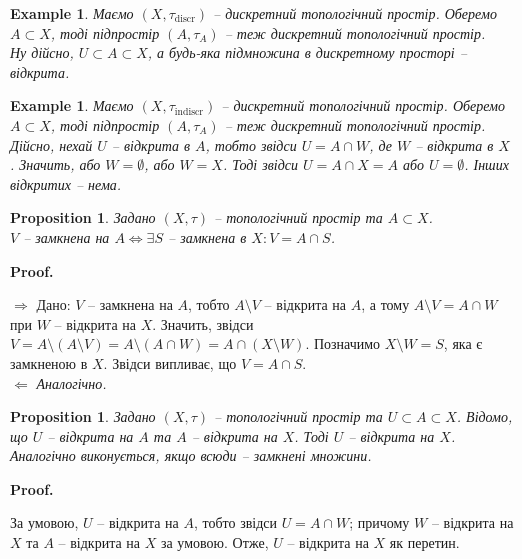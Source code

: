 \documentclass[a4paper, 10pt]{article}
\makeatletter
\def\rightproof{$\boxed{\Rightarrow}$ }
\def\leftproof{$\boxed{\Leftarrow}$ }
\theoremstyle{theoremdd}
\newtheorem{example}[theorem]{Example}
\newtheorem{proposition}[theorem]{Proposition}
\renewenvironment{proof}[1][Proof.\\]{\par
\pushQED{\hfill \qed}%
\normalfont \topsep6\p@\@plus6\p@\relax
\trivlist
\item\relax
{\bfseries
#1\@addpunct{.}}\hspace\labelsep\ignorespaces
}{%
\popQED\endtrivlist\@endpefalse
}
\makeatother
\begin{document}
\begin{example}
Маємо $(X,\tau_{\text{discr}})$ -- дискретний топологічний простір. Оберемо $A \subset X$, тоді підпростір $(A,\tau_{A})$ -- теж дискретний топологічний простір.\\
Ну дійсно, $U \subset A \subset X$, а будь-яка підмножина в дискретному просторі -- відкрита.
\end{example}

\begin{example}
\label{subspace_of_indiscrete_space_is_also_indiscrete}
Маємо $(X,\tau_{\text{indiscr}})$ -- дискретний топологічний простір. Оберемо $A \subset X$, тоді підпростір $(A,\tau_{A})$ -- теж дискретний топологічний простір.\\
Дійсно, нехай $U$ -- відкрита в $A$, тобто звідси $U = A \cap W$, де $W$ -- відкрита в $X$. Значить, або $W = \emptyset$, або $W = X$. Тоді звідси $U = A \cap X = A$ або $U = \emptyset$. Інших відкритих -- нема.
\end{example}

\begin{proposition}
Задано $(X,\tau)$ -- топологічний простір та $A \subset X$.\\
$V$ -- замкнена на $A \iff \exists S$ -- замкнена в $X: V = A \cap S$.
\end{proposition}

\begin{proof}
\rightproof Дано: $V$ -- замкнена на $A$, тобто $A \setminus V$ -- відкрита на $A$, а тому $A \setminus V = A \cap W$ при $W$ -- відкрита на $X$. Значить, звідси $V = A \setminus (A \setminus V) = A \setminus (A \cap W) = A \cap (X \setminus W)$. Позначимо $X \setminus W = S$, яка є замкненою в $X$. Звідси випливає, що $V = A \cap S$.
\bigskip \\
\leftproof \textit{Аналогічно.}
\end{proof}

\begin{proposition}
Задано $(X,\tau)$ -- топологічний простір та $U \subset A \subset X$. Відомо, що $U$ -- відкрита на $A$ та $A$ -- відкрита на $X$. Тоді $U$ -- відкрита на $X$.\\
\textit{Аналогічно виконується, якщо всюди -- замкнені множини.}
\end{proposition}

\begin{proof}
За умовою, $U$ -- відкрита на $A$, тобто звідси $U = A \cap W$; причому $W$ -- відкрита на $X$ та $A$ -- відкрита на $X$ за умовою. Отже, $U$ -- відкрита на $X$ як перетин.
\end{proof}
\end{document}
